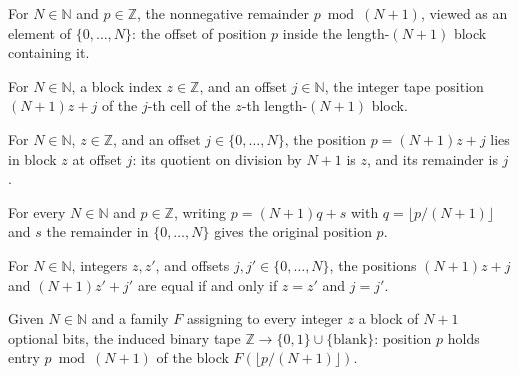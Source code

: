 \begin{definition}
\label{Turing.FinTM.arIndex}
\leanok
For $N \in \mathbb{N}$ and $p \in \mathbb{Z}$, the nonnegative remainder
$p \bmod (N+1)$, viewed as an element of $\{0,\dots,N\}$: the offset of position $p$
inside the length-$(N+1)$ block containing it.
\end{definition}

\begin{definition}
\label{Turing.FinTM.arPos}
\leanok
For $N \in \mathbb{N}$, a block index $z \in \mathbb{Z}$, and an offset
$j \in \mathbb{N}$, the integer tape position $(N+1)z + j$ of the $j$-th cell of the
$z$-th length-$(N+1)$ block.
\end{definition}

\begin{lemma}
\label{Turing.FinTM.arCoords}
\leanok
{}
For $N\in\mathbb{N}$, $z\in\mathbb{Z}$, and an offset $j\in\{0,\ldots,N\}$, the position
$p=(N+1)z+j$ lies in block $z$ at offset $j$: its quotient on division by $N+1$ is $z$,
and its remainder is $j$.
\end{lemma}

\begin{lemma}
\label{Turing.FinTM.arPos_coords}
\leanok
{}
For every $N\in\mathbb{N}$ and $p\in\mathbb{Z}$, writing $p=(N+1)q+s$ with $q=\lfloor
p/(N+1)\rfloor$ and $s$ the remainder in $\{0,\ldots,N\}$ gives the original position
$p$.
\end{lemma}

\begin{lemma}
\label{Turing.FinTM.arPos_eq}
\leanok
{}
For $N\in\mathbb{N}$, integers $z,z'$, and offsets $j,j'\in\{0,\ldots,N\}$, the
positions $(N+1)z+j$ and $(N+1)z'+j'$ are equal if and only if $z=z'$ and $j=j'$.
\end{lemma}

\begin{definition}
\label{Turing.FinTM.arTape}
\leanok
{}
Given $N \in \mathbb{N}$ and a family $F$ assigning to every integer $z$ a block of
$N+1$ optional bits, the induced binary tape $\mathbb{Z} \to \{0,1\} \cup
\{\text{blank}\}$: position $p$ holds entry $p \bmod (N+1)$ of the block
$F(\lfloor p/(N+1) \rfloor)$.
\end{definition}

